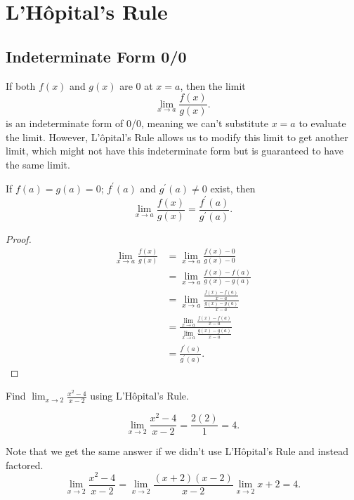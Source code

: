 \section{L'H\^{o}pital's Rule}
\subsection{Indeterminate Form 0/0}
If both $f(x)$ and $g(x)$ are 0 at $x=a$, then the limit
\begin{equation*}
	\lim_{x\to a}{\frac{f(x)}{g(x)}}.
\end{equation*}
is an indeterminate form of 0/0, meaning we can't substitute $x=a$ to evaluate the limit.
However, L'\^{o}pital's Rule allows us to modify this limit to get another limit, which might not have this indeterminate form but is guaranteed to have the same limit.

\begin{theorem}
	If $f(a) = g(a) = 0$; $f^\prime(a)$ and $g^\prime(a) \neq 0$ exist, then
	\begin{equation*}
		\lim_{x\to a}{\frac{f(x)}{g(x)}} = \frac{f^\prime(a)}{g^\prime(a)}.
	\end{equation*}
\end{theorem}
\begin{proof}
	\begin{align*}
		\lim_{x\to a}{\frac{f(x)}{g(x)}} &= \lim_{x\to a}{\frac{f(x)-0}{g(x)-0}} \\
		&= \lim_{x\to a}{\frac{f(x)-f(a)}{g(x)-g(a)}} \\
		&= \lim_{x\to a}{\frac{\frac{f(x)-f(a)}{x-a}}{\frac{g(x)-g(a)}{x-a}}} \\
		&= \frac{\lim_{x\to a}{\frac{f(x)-f(a)}{x-a}}}{\lim_{x\to a}{\frac{g(x)-g(a)}{x-a}}} \\
		&= \frac{f^\prime(a)}{g^\prime(a)}.
	\end{align*}
\end{proof}

\begin{example}
	Find $\lim_{x\to 2}{\frac{x^2-4}{x-2}}$ using L'H\^{o}pital's Rule.
\end{example}
\begin{answer}
	\begin{equation*}
		\lim_{x\to 2}{\frac{x^2-4}{x-2}} = \frac{2(2)}{1} = 4.
	\end{equation*}
	
	Note that we get the same answer if we didn't use L'H\^{o}pital's Rule and instead factored.
	\begin{equation*}
		\lim_{x\to 2}{\frac{x^2-4}{x-2}} = \lim_{x\to 2}{\frac{(x+2)(x-2)}{x-2}} \lim_{x\to 2}{x+2} = 4.
	\end{equation*}
\end{answer}


